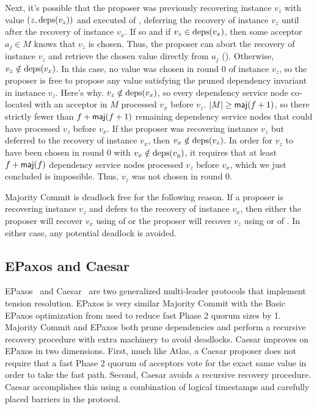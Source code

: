Next, it's possible that the proposer was previously recovering instance $v_z$
with value $(z, \text{deps}(v_z))$ and executed  of
, deferring the recovery of instance $v_z$ until
after the recovery of instance $v_x$.
%
If so and if $v_z \in \text{deps}(v_x)$, then some acceptor $a_j \in M$ knows that
$v_z$ is chosen. Thus, the proposer can abort the recovery of instance $v_z$
and retrieve the chosen value directly from $a_j$ ().
%
Otherwise, $v_z \notin \text{deps}(v_x)$. In this case, no value was chosen in round
$0$ of instance $v_z$, so the proposer is free to propose any value satisfying
the pruned dependency invariant in instance $v_z$. Here's why. $v_z \notin
\text{deps}(v_x)$, so every dependency service node co-located with an acceptor in
$M$ processed $v_x$ before $v_z$. $|M| \geq \textsf{maj}(f+1)$, so there strictly fewer
than $f + \textsf{maj}(f+1)$ remaining dependency service nodes that could have
processed $v_z$ before $v_x$.  If the proposer was recovering instance $v_z$
but deferred to the recovery of instance $v_x$, then $v_x \notin \text{deps}(v_z)$.
In order for $v_z$ to have been chosen in round $0$ with $v_x \notin
\text{deps}(v_y)$, it requires that at least $f + \textsf{maj}(f)$ dependency service nodes
processed $v_z$ before $v_x$, which we just concluded is impossible. Thus,
$v_z$ was not chosen in round $0$.

Majority Commit \BPaxos{} is deadlock free for the following reason. If a
proposer is recovering instance $v_z$ and defers to the recovery of instance
$v_x$, then either the proposer will recover $v_x$ using
 of 
or the proposer will recover $v_z$ using  or
 of .
In either case, any potential deadlock is avoided.

\subsection{EPaxos and Caesar}
EPaxos~\cite{moraru2013there} and Caesar~\cite{arun2017speeding} are two
generalized multi-leader protocols that implement tension resolution. EPaxos is
very similar Majority Commit \BPaxos{} with the Basic EPaxos optimization from
 used to reduce fast Phase 2 quorum sizes by 1.
Majority Commit \BPaxos{} and EPaxos both prune dependencies and perform a
recursive recovery procedure with extra machinery to avoid deadlocks.
%
Caesar improves on EPaxos in two dimensions. First, much like Atlas, a Caesar
proposer does not require that a fast Phase 2 quorum of acceptors vote for the
exact same value in order to take the fast path. Second, Caesar avoids a
recursive recovery procedure. Caesar accomplishes this using a combination of
logical timestamps and carefully placed barriers in the protocol.
